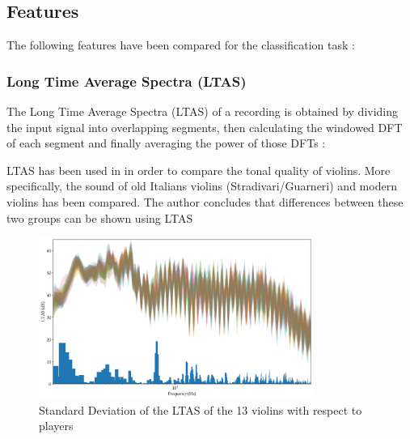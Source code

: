 \documentclass[letterpaper,11pt,leqno]{article}
\begin{document}
\subsection{Features}

The following features have been compared for the classification task :

\subsubsection{Long Time Average Spectra (LTAS)}{

The Long Time Average Spectra (LTAS) of a recording is obtained by dividing the input signal into overlapping segments, then calculating the windowed DFT of each segment and finally averaging the power of those DFTs :

\begin{figure}[!h]
\end{figure}

LTAS has been used in \cite{buenCOMPARINGSOUNDGOLDEN2005} in order to compare the tonal quality of violins. More specifically, the sound of old Italians violins (Stradivari/Guarneri) and modern violins has been compared. The author concludes that differences between these two groups can be shown using LTAS

\begin{figure}[h]
	\includegraphics[width=0.8\textwidth]{../figures/ltas.png}
	\caption{Standard Deviation of the LTAS of the 13 violins with respect to players}
\end{figure}
}
\end{document}
